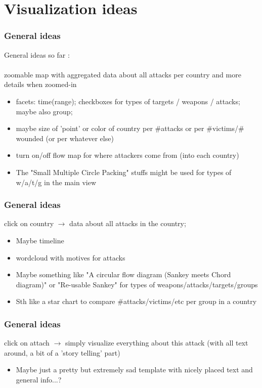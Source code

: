 
\section{Visualization ideas}

  \begin{frame}
    \frametitle{General ideas}
    
    General ideas so far : 
    ~\\~\\
       
    zoomable map with aggregated data about all attacks per country and more details when zoomed-in
    \begin{itemize}
        \item facets: time(range); checkboxes for types of targets / weapons / attacks; maybe also group;
        \item maybe size of 'point' or color of country per \#attacks or per \#victims/\# wounded (or per whatever else)
        \item turn on/off flow map for where attackers come from (into each country)
        \item The "Small Multiple Circle Packing" stuffs might be used for types of w/a/t/g in the main view
    \end{itemize}

  \end{frame}


  \begin{frame}
    \frametitle{General ideas}

    click on country $\rightarrow$ data about all attacks in the country; 
    \begin{itemize}
        \item Maybe timeline
        \item wordcloud with motives for attacks
        \item Maybe something like "A circular flow diagram (Sankey meets Chord diagram)" or "Re-usable Sankey" for types of weapons/attacks/targets/groups
        \item Sth like a star chart to compare \#attacks/victims/etc per group in a country     
    \end{itemize}

  \end{frame}
  
  \begin{frame}
    \frametitle{General ideas}

    click on attach $\rightarrow$ simply visualize everything about this attack (with all text around, a bit of a 'story telling' part)
    \begin{itemize}
        \item Maybe just a pretty but extremely sad template with nicely placed text and general info...?
    \end{itemize}


  \end{frame}



